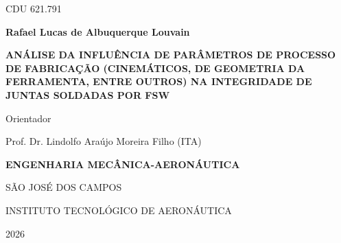 \documentclass[12pt,openany]{report}
\begin{document}
\newpage

\setcounter{page}{1}
\thispagestyle{empty}
\begin{center}
\begin{singlespace}
\hfill CDU 621.791\par
\vspace*{1.2cm}
{\fontsize{16}{20}\selectfont\bfseries Rafael Lucas de Albuquerque Louvain\par}
\vspace{2.5cm}
{\fontsize{20}{26}\selectfont\bfseries ANÁLISE DA INFLUÊNCIA DE PARÂMETROS DE PROCESSO DE FABRICAÇÃO (CINEMÁTICOS, DE GEOMETRIA DA FERRAMENTA, ENTRE OUTROS) NA INTEGRIDADE DE JUNTAS SOLDADAS POR FSW\par}
\vspace{2.5cm}
\begin{onehalfspace}
Orientador\par
Prof. Dr. Lindolfo Araújo Moreira Filho (ITA)\par
\end{onehalfspace}
\vspace{2.5cm}
{\fontsize{16}{20}\selectfont\bfseries ENGENHARIA MECÂNICA-AERONÁUTICA\par}
\vfill
SÃO JOSÉ DOS CAMPOS\par
INSTITUTO TECNOLÓGICO DE AERONÁUTICA\par
2026\par
\end{singlespace}
\end{center}
\newpage
\end{document}
